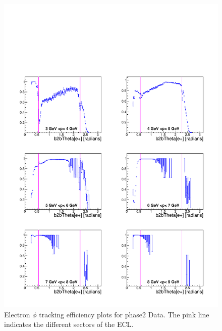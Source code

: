 \documentclass[a4paper,11pt,twosided,final,german,openbib,pdftex,listof=totoc,bibliography=totoc]{scrbook}
\begin{document}
\begin{appendix}
\begin{figure}[!htbp]
	\centering
	\includegraphics[width=\textwidth]{Plots/master/xPMThetaem_Data}
	\caption[Momentum $\theta$ Electron Efficiency Phase2 Data]{Electron $\phi$ tracking efficiency plots for phase2 Data. The pink line indicates the different sectors of the ECL.}
	\label{plt:PMThetaem_Data}
\end{figure}





\end{appendix}
\end{document}
